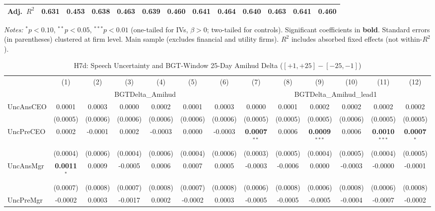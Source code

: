 \documentclass[11pt,a4paper]{article}
\begin{document}
\begin{table}[htbp]
\begin{tabular}{lcccccccccccc}
Adj.~$R^2$ & 0.631 & 0.453 & 0.638 & 0.463 & 0.639 & 0.460 & 0.641 & 0.464 & 0.640 & 0.463 & 0.641 & 0.460 \\
\bottomrule
\end{tabular}
\begin{minipage}{\linewidth}
\vspace{2pt}\scriptsize
\textit{Notes:} $^{*}p<0.10$, $^{**}p<0.05$, $^{***}p<0.01$ (one-tailed for IVs, $\beta > 0$; two-tailed for controls).
 Significant coefficients in \textbf{bold}.
 Standard errors (in parentheses) clustered at firm level.
 Main sample (excludes financial and utility firms).
 $R^2$ includes absorbed fixed effects (not within-$R^2$).
\end{minipage}
\end{table}
\clearpage
\begin{table}[htbp]
\centering
\caption{H7d: Speech Uncertainty and BGT-Window 25-Day Amihud Delta ($[+1,+25]-[-25,-1]$)}
\label{tab:h7d}
\scriptsize
\begin{tabular}{lcccccccccccc}
\toprule
 & (1) & (2) & (3) & (4) & (5) & (6) & (7) & (8) & (9) & (10) & (11) & (12) \\
 & \multicolumn{6}{c}{BGTDelta\_Amihud} & \multicolumn{6}{c}{BGTDelta\_Amihud\_lead1} \\
\cmidrule(lr){2-7} \cmidrule(lr){8-13}
\midrule
UncAnsCEO & 0.0001 & 0.0003 & 0.0000 & 0.0002 & 0.0001 & 0.0003 & 0.0000 & 0.0001 & 0.0002 & 0.0002 & 0.0002 & 0.0002 \\
 & (0.0005) & (0.0006) & (0.0006) & (0.0006) & (0.0006) & (0.0006) & (0.0005) & (0.0005) & (0.0005) & (0.0006) & (0.0005) & (0.0005) \\
UncPreCEO & 0.0002 & -0.0001 & 0.0002 & -0.0003 & 0.0000 & -0.0003 & \textbf{0.0007}$^{**}$ & 0.0006 & \textbf{0.0009}$^{***}$ & 0.0006 & \textbf{0.0010}$^{***}$ & \textbf{0.0007}$^{*}$ \\
 & (0.0004) & (0.0006) & (0.0004) & (0.0006) & (0.0004) & (0.0006) & (0.0003) & (0.0005) & (0.0004) & (0.0005) & (0.0004) & (0.0005) \\
UncAnsMgr & \textbf{0.0011}$^{*}$ & 0.0009 & -0.0005 & 0.0006 & 0.0007 & 0.0005 & -0.0003 & -0.0006 & 0.0000 & -0.0003 & -0.0000 & -0.0001 \\
 & (0.0007) & (0.0008) & (0.0007) & (0.0008) & (0.0007) & (0.0008) & (0.0006) & (0.0008) & (0.0006) & (0.0008) & (0.0006) & (0.0008) \\
UncPreMgr & -0.0002 & 0.0003 & -0.0017 & 0.0002 & -0.0002 & 0.0003 & -0.0005 & -0.0005 & -0.0005 & -0.0004 & -0.0007 & -0.0002 \\

\end{tabular}
\end{table}
\end{document}
